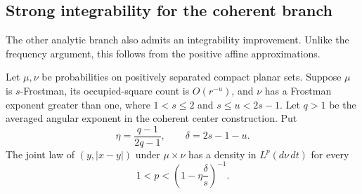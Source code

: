 \subsection{Strong integrability for the coherent branch}\label{lp:coherent}

The other analytic branch also admits an integrability improvement. Unlike the
frequency argument, this follows from the positive affine approximations.

\begin{proposition}\label{lp:coherent-prop}
Let \(\mu,\nu\) be probabilities on positively separated compact planar sets.
Suppose \(\mu\) is \(s\)-Frostman, its occupied-square count is
\(O(r^{-u})\), and \(\nu\) has a Frostman exponent greater than one, where
\(1<s\le2\) and \(s\le u<2s-1\).
Let \(q>1\) be the averaged angular exponent in the coherent center
construction. Put
\[
 \eta=\frac{q-1}{2q-1},\qquad \delta=2s-1-u.
\]
The joint law of \((y,|x-y|)\) under \(\mu\times\nu\) has a density
in \(L^p(d\nu\,dt)\) for every
\begin{equation}\label{lp:coherent-range}
 1<p<\left(1-\eta\frac{\delta}{s}\right)^{-1}.
\end{equation}
\end{proposition}
